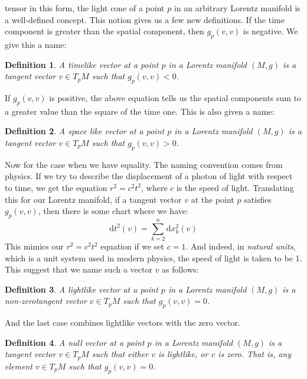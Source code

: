 \documentclass{article}
\theoremstyle{plain}
\theoremstyle{thmit}
\theoremstyle{normal}
\newtheorem{definition}{Definition}[section]
\begin{document}
        tensor in this form, the light cone of a point $p$ in an arbitrary
        Lorentz manifold is a well-defined concept. This notion gives us a few
        new definitions. If the time component is greater than the spatial
        component, then $g_{p}(v,v)$ is negative. We give this a name:
        \begin{definition}
            A timelike vector at a point $p$ in a Lorentz manifold $(M,g)$ is a
            tangent vector $v\in{T}_{p}M$ such that $g_{p}(v,v)<0$.
        \end{definition}
        If $g_{p}(v,v)$ is positive, the above equation tells us the spatial
        components sum to a greater value than the square of the time one. This
        is also given a name:
        \begin{definition}
            A space like vector at a point $p$ in a Lorentz manifold $(M,g)$ is
            a tangent vector $v\in{T}_{p}M$ such that $g_{p}(v,v)>0$.
        \end{definition}
        Now for the case when we have equality. The naming convention comes from
        physics. If we try to describe the displacement of a photon of light
        with respect to time, we get the equation $r^{2}=c^{2}t^{2}$, where
        $c$ is the speed of light. Translating this for our Lorentz manifold,
        if a tangent vector $v$ at the point $p$ satisfies
        $g_{p}(v,v)$, then there is some chart where we have:
        \begin{equation}
            \textrm{d}t^{2}(v)=\sum_{k=2}^{n}\textrm{d}x_{k}^{2}(v)
        \end{equation}
        This mimics our $r^{2}=c^{2}t^{2}$ equation if we set $c=1$. And indeed,
        in \textit{natural units}, which is a unit system used in modern
        physics, the speed of light is taken to be 1. This suggest that we name
        such a vector $v$ as follows:
        \begin{definition}
            A lightlike vector at a point $p$ in a Lorentz manifold $(M,g)$ is a
            non-zerotangent vector $v\in{T}_{p}M$ such that $g_{p}(v,v)=0$.
        \end{definition}
        And the last case combines lightlike vectors with the zero vector.
        \begin{definition}
            A null vector at a point $p$ in a Lorentz manifold $(M,g)$ is a
            tangent vector $v\in{T}_{p}M$ such that either $v$ is lightlike, or
            $v$ is zero. That is, any element $v\in{T}_{p}M$ such that
            $g_{p}(v,v)=0$.
        \end{definition}
\end{document}

